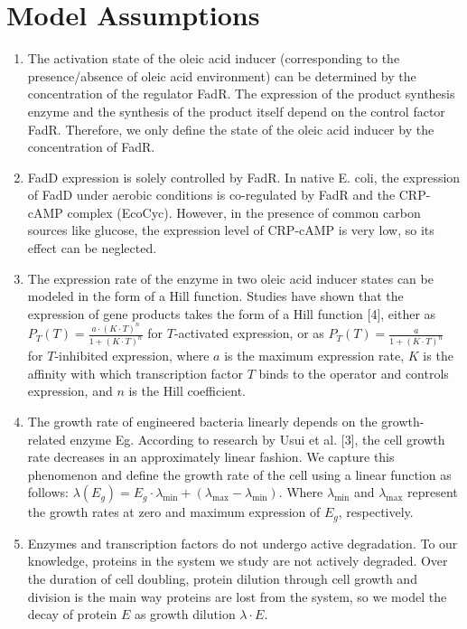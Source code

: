 \documentclass[UTF8]{article}
\begin{document}
\section{Model Assumptions}

\begin{enumerate}
	\item The activation state of the oleic acid inducer (corresponding to the presence/absence of oleic acid environment) can be determined by the concentration of the regulator FadR. The expression of the product synthesis enzyme and the synthesis of the product itself depend on the control factor FadR. Therefore, we only define the state of the oleic acid inducer by the concentration of FadR.
	\item FadD expression is solely controlled by FadR. In native E. coli, the  expression of FadD under aerobic conditions is co-regulated by FadR and  the CRP-cAMP complex (EcoCyc). However, in the presence of common carbon sources like glucose, the expression level of CRP-cAMP is very low, so  its effect can be neglected.
	\item The expression rate of the enzyme in two oleic acid inducer states can be modeled in the form of a Hill function. Studies have shown that the expression of gene products takes the form of a Hill function [4], either as $P_T(T)=\frac{a \cdot(K \cdot T)^n}{1+(K \cdot T)^n}$ for $T$-activated expression, or as $P_T(T)=\frac{a}{1+(K \cdot T)^n}$ for $T$-inhibited expression, where $a$ is the maximum expression rate, $K$ is the affinity with which transcription factor $T$ binds to the operator and controls expression, and $n$ is the Hill coefficient.
	\item The growth rate of engineered bacteria linearly depends on the growth-related enzyme Eg. According to research by Usui et al. [3], the cell growth rate decreases in an approximately linear fashion. We capture this phenomenon and define the growth rate of the cell using a linear function as follows: $\lambda\left(E_g\right)=E_g \cdot \lambda_{\min }+\left(\lambda_{\max }-\lambda_{\min }\right)$. Where $\lambda_{\min }$ and $\lambda_{\max }$ represent the growth rates at zero and maximum expression of $E_g$, respectively.
	\item Enzymes and transcription factors do not undergo active degradation. To  our knowledge, proteins in the system we study are not actively  degraded. Over the duration of cell doubling, protein dilution through  cell growth and division is the main way proteins are lost from the  system, so we model the decay of protein $E$ as growth dilution $\lambda \cdot E$.
\end{enumerate}
\end{document}
